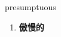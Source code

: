 
\begin{frame}
{\huge presumptuous}
\begin{center}
\begin{enumerate}\Large
  \item \textbf{傲慢的}
\end{enumerate}
\end{center}
\end{frame}
